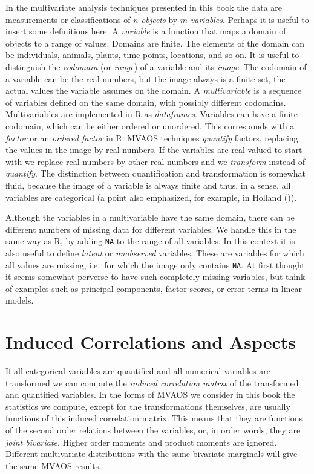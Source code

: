 \documentclass[
  12pt,
  letterpaper,
]{scrbook}
\begin{document}
In the multivariate analysis techniques presented in this book the data
are measurements or classifications of \(n\) \emph{objects} by \(m\)
\emph{variables}. Perhaps it is useful to insert some definitions here.
A \emph{variable} is a function that maps a domain of objects to a range
of values. Domains are finite. The elements of the domain can be
individuals, animals, plants, time points, locations, and so on. It is
useful to distinguish the \emph{codomain} (or \emph{range}) of a
variable and its \emph{image}. The codomain of a variable can be the
real numbers, but the image always is a finite set, the actual values
the variable assumes on the domain. A \emph{multivariable} is a sequence
of variables defined on the same domain, with possibly different
codomains. Multivariables are implemented in R as \emph{dataframes}.
Variables can have a finite codomain, which can be either ordered or
unordered. This corresponds with a \emph{factor} or an \emph{ordered
factor} in R. MVAOS techniques \emph{quantify} factors, replacing the
values in the image by real numbers. If the variables are real-valued to
start with we replace real numbers by other real numbers and we
\emph{transform} instead of \emph{quantify}. The distinction between
quantification and transformation is somewhat fluid, because the image
of a variable is always finite and thus, in a sense, all variables are
categorical (a point also emphasized, for example, in Holland
()).

Although the variables in a multivariable have the same domain, there
can be different numbers of missing data for different variables. We
handle this in the same way as R, by adding \texttt{NA} to the range of
all variables. In this context it is also useful to define \emph{latent}
or \emph{unobserved} variables. These are variables for which all values
are missing, i.e.~for which the image only contains \texttt{NA}. At
first thought it seems somewhat perverse to have such completely missing
variables, but think of examples such as principal components, factor
scores, or error terms in linear models.

\section{Induced Correlations and
Aspects}\label{induced-correlations-and-aspects}

If all categorical variables are quantified and all numerical variables
are transformed we can compute the \emph{induced correlation matrix} of
the transformed and quantified variables. In the forms of MVAOS we
consider in this book the statistics we compute, except for the
transformations themselves, are usually functions of this induced
correlation matrix. This means that they are functions of the second
order relations between the variables, or, in order words, they are
\emph{joint bivariate}. Higher order moments and product moments are
ignored. Different multivariate distributions with the same bivariate
marginals will give the same MVAOS results.
\end{document}
